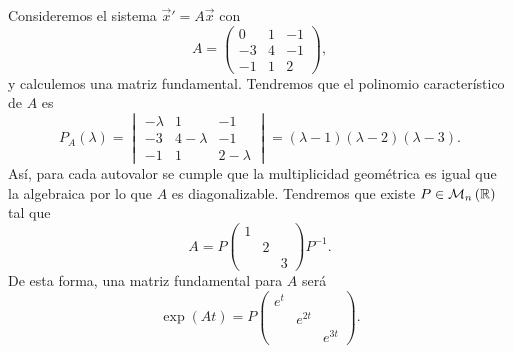 \begin{eg}
Consideremos el sistema $\displaystyle \vec{x}' = A \vec{x} $ con 
\[A = \begin{pmatrix} 0 & 1 & -1 \\ -3 & 4 & -1 \\ -1 & 1 & 2 \end{pmatrix} ,\]
y calculemos una matriz fundamental. Tendremos que el polinomio característico de $\displaystyle A $ es
\[P_{A}\left(\lambda \right)= \begin{vmatrix} -\lambda & 1 & -1 \\ -3 & 4-\lambda & -1 \\ -1 & 1 & 2-\lambda \end{vmatrix} =\left(\lambda-1\right)\left(\lambda-2\right)\left(\lambda-3\right).\]
Así, para cada autovalor se cumple que la multiplicidad geométrica es igual que la algebraica por lo que $\displaystyle A $ es diagonalizable. Tendremos que existe $\displaystyle P \in \mathcal{M}_{n}\left(\mathbb{R}\right) $ tal que 
\[A = P\begin{pmatrix} 1 & & \\ & 2 & \\ & & 3 \end{pmatrix}P^{-1} .\]
De esta forma, una matriz fundamental para $\displaystyle A $ será
\[\exp\left(At\right)=P\begin{pmatrix} e^{t} & & \\ & e^{2t} & \\ & & e^{3t} \end{pmatrix} .\]
\end{eg}

